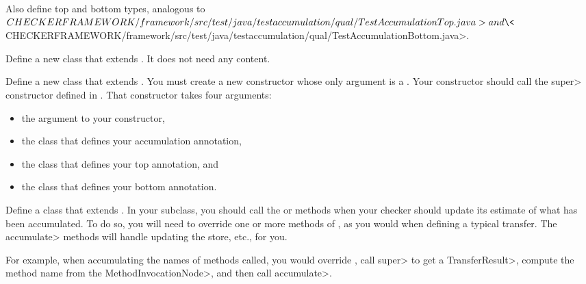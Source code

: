 Also define top and bottom types, analogous to
\<$CHECKERFRAMEWORK/framework/src/test/java/testaccumulation/qual/TestAccumulationTop.java>
and
\<$CHECKERFRAMEWORK/framework/src/test/java/testaccumulation/qual/TestAccumulationBottom.java>.


Define a new class that extends .
It does not need any content.

Define a new class that extends .
You must create a new constructor whose only argument is a .
Your constructor should call the \<super> constructor defined in
. That constructor takes four arguments:
\begin{itemize}
\item the  argument to your constructor,
\item the class that defines your accumulation annotation,
\item the class that defines your top annotation, and
\item the class that defines your bottom annotation.
\end{itemize}


Define a class that extends .
In your subclass, you should call the
or
methods when your checker should update its estimate of what has been accumulated.
To do so, you will need to override one or more methods of ,
as you would when defining a typical transfer. The \<accumulate> methods will handle updating the store,
etc., for you.

For example, when accumulating the names of methods called, you would override
,
call \<super> to get a \<TransferResult>, compute the method name from the \<MethodInvocationNode>,
and then call \<accumulate>.

